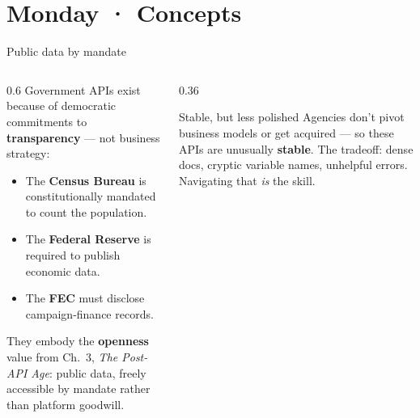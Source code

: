 \documentclass[9pt,aspectratio=169]{beamer}
\begin{document}
\section{Monday · Concepts}

\begin{frame}{Public data by mandate}
    \begin{columns}[T]
        \begin{column}{0.6\textwidth}
            Government APIs exist because of democratic commitments to \textbf{transparency} --- not business strategy:
            \begin{itemize}
                \item The \textbf{Census Bureau} is constitutionally mandated to count the population.
                \item The \textbf{Federal Reserve} is required to publish economic data.
                \item The \textbf{FEC} must disclose campaign-finance records.
            \end{itemize}

            \vspace{0.75em}

            They embody the \textbf{openness} value from Ch.~3, \textit{The Post-API Age}: public data, freely accessible by mandate rather than platform goodwill.
        \end{column}
        \begin{column}{0.36\textwidth}
            \begin{block}{Stable, but less polished}
                \footnotesize Agencies don't pivot business models or get acquired --- so these APIs are unusually \textbf{stable}. The tradeoff: dense docs, cryptic variable names, unhelpful errors. Navigating that \textit{is} the skill.
            \end{block}
        \end{column}
    \end{columns}
\end{frame}
\end{document}
